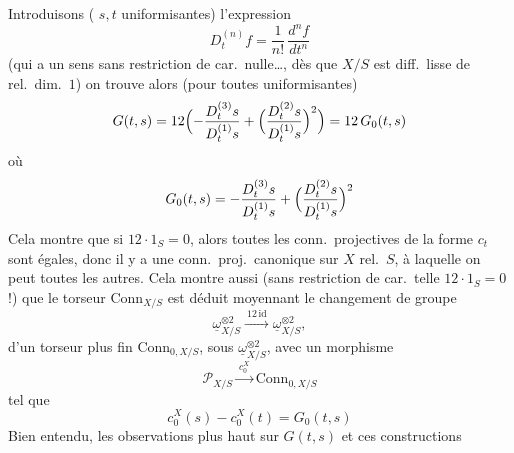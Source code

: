 \documentclass[11pt,a4paper]{article}
\begin{document}
Introduisons ( $s,t$ \struck{\ill{}} uniformisantes) l'expression
\[
D^{(n)}_tf=\frac{1}{n!}\,\frac{d^nf}{dt^n}
\]
(qui a un sens sans restriction de car.\ nulle…, dès que $X/S$ est diff.\ lisse de \struck{\ill{}} rel.\ dim.\ $1$) on trouve alors (pour toutes uniformisantes)
\[
G(t,s)=12\Bigl(-\frac{D^{(3)}_ts}{D^{(1)}_ts}+\Bigl(\frac{D^{(2)}_ts}{D^{(1)}_ts}\Bigr)^2\Bigr)=12\,G_0(t,s)
\]
où
\[
G_0(t,s)=-\frac{D^{(3)}_ts}{D^{(1)}_ts}+\Bigl(\frac{D^{(2)}_ts}{D^{(1)}_ts}\Bigr)^2
\]
Cela montre que si $12\cdot1_S=0$, alors toutes les conn.\ projectives de la forme $c_t$ sont égales, donc il y a une conn.\ proj.\ canonique sur $X$ rel.\ $S$, à laquelle on peut  toutes les autres. Cela montre aussi (sans restriction de car.\ telle $12\cdot1_S=0$ !) que le torseur \struck{\ill{}} $\mathrm{Conn}_{X/S}$ est déduit moyennant le changement de groupe 
\[
\underline{\omega}^{\otimes2}_{X/S}\xrightarrow{\ 12\,\mathrm{id}\ }\underline{\omega}^{\otimes2}_{X/S},
\]
d'un torseur plus fin $\mathrm{Conn}_{0,X/S}$, sous $\underline{\omega}^{\otimes2}_{X/S}$, avec un morphisme
\[
\mathcal{P}_{X/S}\xrightarrow{\ c^X_0\ }\mathrm{Conn}_{0,X/S}
\]
tel que
\[
c^X_0(s)-c^X_0(t)=G_0(t,s)
\]
Bien entendu, les observations plus haut sur  $G(t,s)$ et ces constructions
\end{document}
